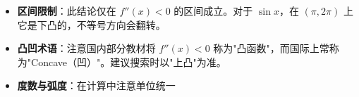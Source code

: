 \begin{trapbox}
\begin{itemize}
    \item \textbf{区间限制}：此结论仅在 $f''(x) < 0$ 的区间成立。对于 $\sin x$，在 $(\pi, 2\pi)$ 上它是下凸的，不等号方向会翻转。
    \item \textbf{凸凹术语}：注意国内部分教材将 $f''(x) < 0$ 称为"凸函数"，而国际上常称为"Concave（凹）"。建议搜索时以"上凸"为准。
    \item \textbf{度数与弧度}：在计算中注意单位统一
\end{itemize}
\end{trapbox}